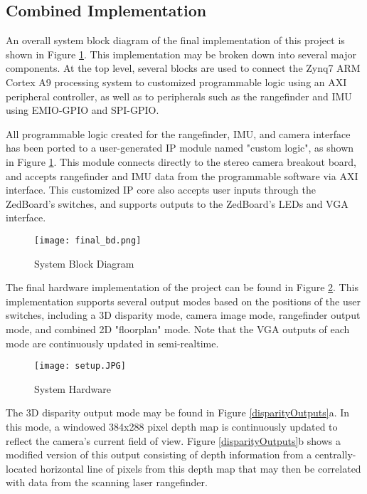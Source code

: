 \subsection{Combined Implementation}
An overall system block diagram of the final implementation of this project is shown in Figure \ref{finalBD}. This implementation may be broken down into several major components. At the top level, several blocks are used to connect the Zynq7 ARM Cortex A9 processing system to customized programmable logic using an AXI peripheral controller, as well as to peripherals such as the rangefinder and IMU using EMIO-GPIO and SPI-GPIO. 
\par
All programmable logic created for the rangefinder, IMU, and camera interface has been ported to a user-generated IP module named "custom logic", as shown in Figure \ref{finalBD}. This module connects directly to the stereo camera breakout board, and accepts rangefinder and IMU data from the programmable software via AXI interface. This customized IP core also accepts user inputs through the ZedBoard's switches, and supports outputs to the ZedBoard's LEDs and VGA interface. 
\par
\begin{figure}[!htb] 
	\centerline{
	\texttt{[image: final\_bd.png]}
	}
	\caption{System Block Diagram}
	\label{finalBD}
\end{figure}
\par
The final hardware implementation of the project can be found in Figure 
\ref{finalHW}. This implementation supports several output modes based on the positions of the user switches, including a 3D disparity mode, camera image mode, rangefinder output mode, and combined 2D "floorplan" mode. Note that the VGA outputs of each mode are continuously updated in semi-realtime. 
\begin{figure}[H]  
 	\centerline{
	\texttt{[image: setup.JPG]}
	}
	\caption{System Hardware}
	\label{finalHW}
\end{figure}
\par
The 3D disparity output mode may be found in Figure \ref{disparityOutputs}a. In this mode, a windowed 384x288 pixel depth map is continuously updated to reflect the camera's current field of view. Figure \ref{disparityOutputs}b shows a modified version of this output consisting of depth information from a centrally-located horizontal line of pixels from this depth map that may then be correlated with data from the scanning laser rangefinder. 
\par
